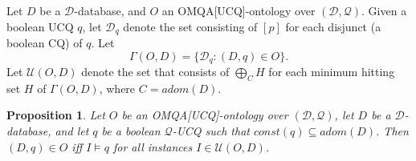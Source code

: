 \documentclass[letterpaper]{article} %
\newtheorem{prop}[thm]{Proposition}
\theoremstyle{definition}
\theoremstyle{remark}
\theoremstyle{definition}
\begin{document}
Let $D$ be a $\mathscr{D}$-database, and $O$ an OMQA[UCQ]-ontology over $(\mathscr{D},\mathscr{Q})$. Given a boolean UCQ $q$, let $\mathcal{D}_q$ denote the set consisting of $[p]$ for each disjunct (a boolean CQ) of $q$. Let 
\begin{equation*}
\Gamma(O,D)=\{\mathcal{D}_q: (D,q)\in O\}.
\end{equation*} 
Let $\mathcal{U}(O,D)$ denote the set that consists of 
$
{\bigoplus}_{C}H
$
for each minimum hitting set $H$ of $\Gamma(O,D)$, where $C=adom(D)$.


\begin{prop}\label{prop:query2um}
Let $O$ be an OMQA[UCQ]-ontology over $(\mathscr{D},\mathscr{Q})$, let $D$ be a $\mathscr{D}$-database, and let $q$ be a boolean $\mathscr{Q}$-UCQ such that $\textit{const}(q)\subseteq\textit{adom}(D)$. Then $(D,q)\in O$ iff $I\models q$ for all instances $I\in \mathcal{U}(O,D)$.
\end{prop}
\end{document}
